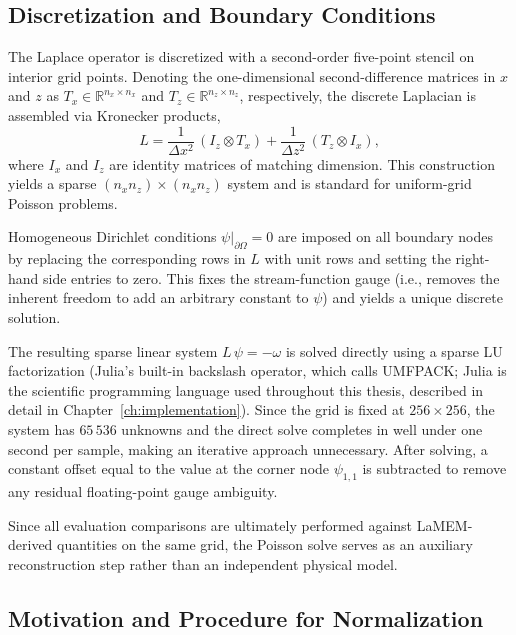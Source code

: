 \subsection{Discretization and Boundary Conditions}

The Laplace operator is discretized with a second-order five-point stencil on interior grid points. Denoting the one-dimensional second-difference matrices in $x$ and $z$ as $T_x \in \mathbb{R}^{n_x \times n_x}$ and $T_z \in \mathbb{R}^{n_z \times n_z}$, respectively, the discrete Laplacian is assembled via Kronecker products,
\[
    L = \frac{1}{\Delta x^2}\,(I_z \otimes T_x)
      + \frac{1}{\Delta z^2}\,(T_z \otimes I_x),
\]
where $I_x$ and $I_z$ are identity matrices of matching dimension. This construction yields a sparse $(n_x n_z)\times(n_x n_z)$ system and is standard for uniform-grid Poisson problems.

Homogeneous Dirichlet conditions $\psi|_{\partial\Omega}=0$ are imposed on all boundary nodes by replacing the corresponding rows in $L$ with unit rows and setting the right-hand side entries to zero. This fixes the stream-function gauge (i.e., removes the inherent freedom to add an arbitrary constant to $\psi$) and yields a unique discrete solution.

The resulting sparse linear system $L\,\psi = -\omega$ is solved directly using a sparse LU factorization (Julia's built-in backslash operator, which calls UMFPACK; Julia is the scientific programming language used throughout this thesis, described in detail in Chapter~\ref{ch:implementation}). Since the grid is fixed at $256\times256$, the system has $65\,536$ unknowns and the direct solve completes in well under one second per sample, making an iterative approach unnecessary. After solving, a constant offset equal to the value at the corner node $\psi_{1,1}$ is subtracted to remove any residual floating-point gauge ambiguity.

Since all evaluation comparisons are ultimately performed against LaMEM-derived quantities on the same grid, the Poisson solve serves as an auxiliary reconstruction step rather than an independent physical model.

\subsection{Motivation and Procedure for Normalization}

